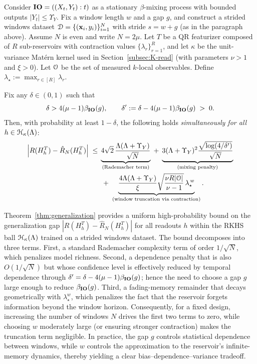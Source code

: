 \begin{theorem}\label{thm:generalization}
Consider $\mathbf{IO} = ((X_t,Y_t):t)$ as a stationary $\beta$-mixing process with bounded outputs
$|Y_t|\leq \Upsilon_Y$. Fix a window length $w$ and a gap $g$, and construct a strided windows
dataset ${\mathcal{D}}=\{({\mathbf{x}}_i,y_i)\}_{i=1}^N$ with stride $s=w+g$ (as in the paragraph above). Assume $N$ is even and write $N=2\mu$. Let $T$ be a QR featurizer composed of $R$ sub-reservoirs with contraction values $\{\lambda_r\}_{r=1}^R$, and let $\kappa$ be the unit-variance Mat\'ern kernel used in Section~\ref{subsec:K-read}
(with parameters $\nu>1$ and $\xi>0$). Let ${\mathcal{O}}$ be the set of measured $k$-local observables.
Define $\lambda_\star := \max_{r\in[R]}\lambda_r$.

Fix any $\delta\in(0,1)$ such that
\begin{equation}
    \delta > 4(\mu-1)\beta_{\mathbf{IO}}(g),
    \qquad
    \delta' := \delta - 4(\mu-1)\beta_{\mathbf{IO}}(g) \;>\; 0.
\end{equation}
Then, with probability at least $1-\delta$, the following holds \emph{simultaneously for all}
$h\in {\mathcal{H}}_{\kappa}(\Lambda)$:
\begin{equation}\label{eq:bound-generalization}
\begin{aligned}
\left| R(H^T_h) - \hat{R}_N(H^T_h) \right|
\;\leq\;
&\underbrace{4\sqrt{2}\,\frac{\Lambda(\Lambda+\Upsilon_Y)}{\sqrt{N}}}_{\text{(Rademacher term)}}
\;+\;
\underbrace{3(\Lambda+\Upsilon_Y)^2\frac{\sqrt{\log(4/\delta')}}{\sqrt{N}}}_{\text{(mixing penalty)}}\\
&\;+\;
\underbrace{\frac{4\Lambda(\Lambda+\Upsilon_Y)}{\xi}\sqrt{\frac{\nu R|{\mathcal{O}}|}{\nu-1}}\,
\lambda_\star^{\,w}}_{\text{(window truncation via contraction)}}.
\end{aligned}
\end{equation}
\end{theorem}

Theorem~\ref{thm:generalization} provides a uniform high-probability bound on the generalization gap $|R(H^T_h) - \hat{R}_N(H^T_h)|$ for all readouts $h$ within the RKHS ball ${\mathcal{H}}_{\kappa}(\Lambda)$ trained on a strided windows dataset. The bound decomposes into three terms. First, a standard Rademacher complexity term of order $1/\sqrt{N}$, which penalizes model richness. Second, a dependence penalty that is also $O(1/\sqrt{N})$ but whose confidence level is effectively reduced by temporal dependence through $\delta' = \delta - 4(\mu - 1)\beta_{\mathbf{IO}}(g)$; hence the need to choose a gap $g$ large enough to reduce $\beta_{\mathbf{IO}}(g)$. Third, a fading-memory remainder that decays geometrically with $\lambda_\star^w$, which penalizes the fact that the reservoir forgets information beyond the window horizon. Consequently, for a fixed design, increasing the number of windows $N$ drives the first two terms to zero, while choosing $w$ moderately large (or ensuring stronger contraction) makes the truncation term negligible. In practice, the gap $g$ controls statistical dependence between windows, while $w$ controls the approximation to the reservoir's infinite-memory dynamics, thereby yielding a clear bias--dependence--variance tradeoff.




